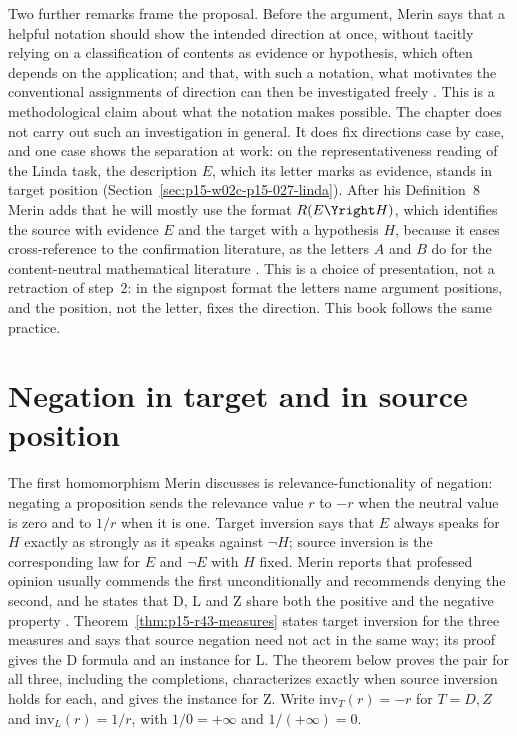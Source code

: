 Two further remarks frame the proposal. Before the argument, Merin says
that a helpful notation should show the intended direction at once,
without tacitly relying on a classification of contents as evidence or
hypothesis, which often depends on the application; and that, with such
a notation, what motivates the conventional assignments of direction can
then be investigated freely \cite[p.~268]{Merin2021Relevance}. This is a
methodological claim about what the notation makes possible. The chapter
does not carry out such an investigation in general. It does fix
directions case by case, and one case shows the separation at work: on
the representativeness reading of the Linda task, the description
\(E\), which its letter marks as evidence, stands in target position
(Section~\ref{sec:p15-w02c-p15-027-linda}). After his Definition~8 Merin
adds that he will mostly use the format \(R(E\Yright H)\), which
identifies the source with evidence \(E\) and the target with a
hypothesis \(H\), because it eases cross-reference to the confirmation
literature, as the letters \(A\) and \(B\) do for the content-neutral
mathematical literature \cite[p.~269]{Merin2021Relevance}. This is a
choice of presentation, not a retraction of step~2: in the signpost
format the letters name argument positions, and the position, not the
letter, fixes the direction. This book follows the same practice.

\section{Negation in target and in source position}
\label{sec:p15-w02c-p15-027-negation}

The first homomorphism Merin discusses is relevance-functionality of
negation: negating a proposition sends the relevance value \(r\) to
\(-r\) when the neutral value is zero and to \(1/r\) when it is one.
Target inversion says that \(E\) always speaks for \(H\) exactly as
strongly as it speaks against \(\neg H\); source inversion is the corresponding
law for \(E\) and \(\neg E\) with \(H\) fixed. Merin reports that professed
opinion usually commends the first unconditionally and recommends
denying the second, and he states that D, L and Z share both the
positive and the negative property \cite[p.~272]{Merin2021Relevance}.
Theorem~\ref{thm:p15-r43-measures} states target inversion for the
three measures and says that source negation need not act in the same
way; its proof gives the D formula and an instance for L. The theorem below proves the pair for all three, including the
completions, characterizes exactly when source inversion holds for
each, and gives the instance for Z. Write \(\mathrm{inv}_T(r)=-r\) for
\(T=D,Z\) and \(\mathrm{inv}_L(r)=1/r\), with \(1/0=+\infty\) and
\(1/(+\infty)=0\).

